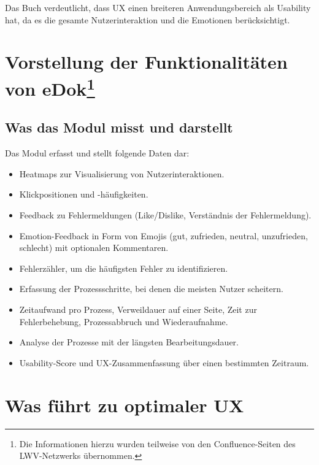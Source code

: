 \documentclass[12pt,oneside]{article}
\begin{document}
 


Das Buch \cite{measuring} verdeutlicht, dass UX einen breiteren Anwendungsbereich als Usability hat, da es die gesamte Nutzerinteraktion und die Emotionen berücksichtigt.






\section{Vorstellung der Funktionalitäten von eDok\protect \footnote{Die Informationen hierzu wurden teilweise von den Confluence-Seiten des LWV-Netzwerks übernommen.}}



\subsection{Was das Modul misst und darstellt}

Das Modul erfasst und stellt folgende Daten dar:

\begin{itemize} \item Heatmaps zur Visualisierung von Nutzerinteraktionen. \item Klickpositionen und -häufigkeiten. \item Feedback zu Fehlermeldungen (Like/Dislike, Verständnis der Fehlermeldung). \item Emotion-Feedback in Form von Emojis (gut, zufrieden, neutral, unzufrieden, schlecht) mit optionalen Kommentaren. \item Fehlerzähler, um die häufigsten Fehler zu identifizieren. \item Erfassung der Prozessschritte, bei denen die meisten Nutzer scheitern. \item Zeitaufwand pro Prozess, Verweildauer auf einer Seite, Zeit zur Fehlerbehebung, Prozessabbruch und Wiederaufnahme. \item Analyse der Prozesse mit der längsten Bearbeitungsdauer. \item Usability-Score und UX-Zusammenfassung über einen bestimmten Zeitraum. \end{itemize}
 

 
\section{Was führt zu optimaler UX}
 
\end{document}
